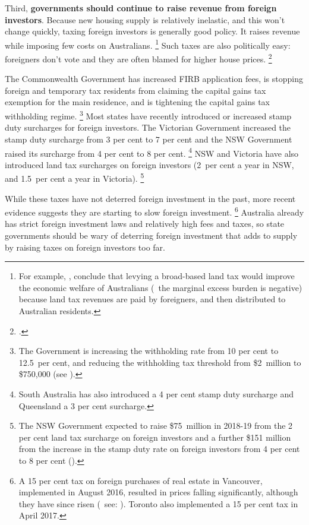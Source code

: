 Third, \textbf{governments should continue to raise revenue from foreign investors}.
Because new housing supply is relatively inelastic, and this won't change quickly, taxing foreign investors is generally good policy.
It raises revenue while imposing few costs on Australians.%
	\footnote{For example, \textcite[][53]{CaoHoskingKouparitsasEtAl2015}, conclude that levying a broad-based land tax would improve the economic welfare of Australians (\ie~the marginal excess burden is negative) because land tax revenues are paid by foreigners, and then distributed to Australian residents.}
Such taxes are also politically easy: foreigners don't vote and they are often blamed for higher house prices.%
	\footcite{RogersetalChineseRealEstate}

The Commonwealth Government has increased FIRB application fees, is stopping foreign and temporary tax residents from claiming the capital gains tax exemption for the main residence, and is tightening the capital gains tax withholding regime.%
	\footnote{The Government is increasing the withholding rate from 10 per cent to 12.5~per cent, and reducing the withholding tax threshold from \$2~million to \$750,000 (see \textcite{Budget2017-18-BP2}).} Most states have recently introduced or increased stamp duty surcharges for foreign investors.
The Victorian Government increased the stamp duty surcharge from 3 per cent to 7 per cent and the NSW Government raised its surcharge from 4 per cent to 8 per cent.%
	\footnote{South Australia has also introduced a 4 per cent stamp duty surcharge and Queensland a 3 per cent surcharge.}
NSW and Victoria have also introduced land tax surcharges on foreign investors (2~per cent a year in NSW, and 1.5~per cent a year in Victoria).%
	\footnote{The NSW Government expected to raise \$75~million in 2018-19 from the 2 per cent land tax surcharge on foreign investors and a further \$151 million from the increase in the stamp duty rate on foreign investors from 4 per cent to 8 per cent  (\textcite[][p.~5-3]{NSW-Budget-2017-18-BS1}).}

While these taxes have not deterred foreign investment in the past, more recent evidence suggests they are starting to slow foreign investment.%
	\footnote{A 15 per cent tax on foreign purchases of real estate in Vancouver, implemented in August 2016, resulted in prices falling significantly, although they have since risen (\eg~see: \textcites{Cranston2017ForeignHome}{BBC2017Vancouver}{CREA2017NationalStats}). Toronto also implemented a 15 per cent tax in April 2017.} 
Australia already has strict foreign investment laws and relatively high fees and taxes, so state governments should be wary of deterring foreign investment that adds to supply by raising taxes on foreign investors too far.

